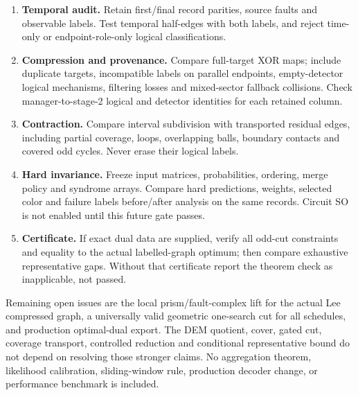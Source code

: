 \begin{enumerate}
condition before using a two-terminal cut. Compare it with the cover;
apply arbitrary detector-row gauges and compare again with fixed residuals.
Reject cuts lacking a parity-preserving witness projection.
\item \textbf{Temporal audit.} Retain first/final record parities, source
faults and observable labels. Test temporal half-edges with both labels,
and reject time-only or endpoint-role-only logical classifications.
\item \textbf{Compression and provenance.} Compare full-target XOR maps;
include duplicate targets, incompatible labels on parallel endpoints,
empty-detector logical mechanisms, filtering losses and mixed-sector
fallback collisions. Check manager-to-stage-2 logical and detector
identities for each retained column.
\item \textbf{Contraction.} Compare interval subdivision with transported
residual edges, including partial coverage, loops, overlapping balls,
boundary contacts and covered odd cycles. Never erase their logical labels.
\item \textbf{Hard invariance.} Freeze input matrices, probabilities,
ordering, merge policy and syndrome arrays. Compare hard predictions,
weights, selected color and failure labels before/after analysis on the
same records. Circuit SO is not enabled until this future gate passes.
\item \textbf{Certificate.} If exact dual data are supplied, verify all
odd-cut constraints and equality to the actual labelled-graph optimum;
then compare exhaustive representative gaps. Without that certificate
report the theorem check as inapplicable, not passed.
\end{enumerate}
Remaining open issues are the local prism/fault-complex lift for the actual
Lee compressed graph, a universally valid geometric one-search cut for
all schedules, and production optimal-dual export. The DEM quotient,
cover, gated cut, coverage transport, controlled reduction and conditional
representative bound do not depend on resolving those stronger claims.
No aggregation theorem, likelihood calibration, sliding-window rule,
production decoder change, or performance benchmark is included.

